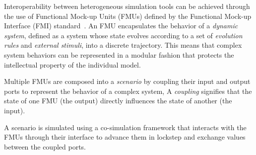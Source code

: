 Interoperability between heterogeneous simulation tools can be achieved through the use of Functional Mock-up Units (FMUs) defined by the Functional Mock-up Interface (FMI) standard~\cite{FMI2014}.
An FMU encapsulates the behavior of a \emph{dynamic system}, defined as a system whose state evolves according to a set of \emph{evolution rules} and \emph{external stimuli}, into a discrete trajectory.
This means that complex system behaviors can be represented in a modular fashion that protects the intellectual property of the individual model.

Multiple FMUs are composed into a \emph{scenario} by coupling their input and output ports to represent the behavior of a complex system,
A \emph{coupling} signifies that the state of one FMU (the output) directly influences the state of another (the input).

A scenario is simulated using a co-simulation framework that interacts with the FMUs through their interface to advance them in lockstep and exchange values between the coupled ports.

